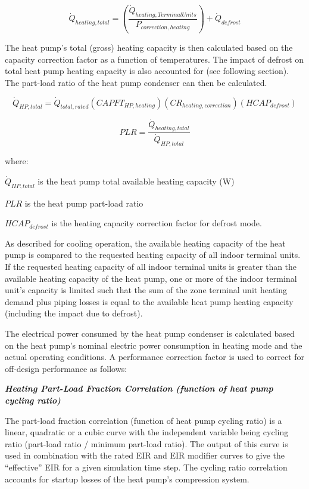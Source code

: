 \begin{equation}
  \dot{Q}_{heating,total} = \left( \frac{\dot{Q}_{heating,TerminalUnits}}{P_{correction,heating}} \right) + \dot{Q}_{defrost}
\end{equation}

The heat pump's total (gross) heating capacity is then calculated based on the capacity correction factor as a function of temperatures. The impact of defrost on total heat pump heating capacity is also accounted for (see following section). The part-load ratio of the heat pump condenser can then be calculated.

\begin{equation}
  \dot{Q}_{HP,total} = \dot{Q}_{total,rated} \left( CAPFT_{HP,heating} \right) \left( CR_{heating,correction} \right) \left( HCAP_{defrost} \right)
\end{equation}

\begin{equation}
  PLR = \frac{\dot{Q}_{heating,total}}{\dot{Q}_{HP,total}}
\end{equation}

where:

\(\dot{Q}_{HP,total}\) is the heat pump total available heating capacity (W)

\(PLR\) is the heat pump part-load ratio

\(HCAP_{defrost}\) is the heating capacity correction factor for defrost mode.

As described for cooling operation, the available heating capacity of the heat pump is compared to the requested heating capacity of all indoor terminal units. If the requested heating capacity of all indoor terminal units is greater than the available heating capacity of the heat pump, one or more of the indoor terminal unit's capacity is limited such that the sum of the zone terminal unit heating demand plus piping losses is equal to the available heat pump heating capacity (including the impact due to defrost).

The electrical power consumed by the heat pump condenser is calculated based on the heat pump's nominal electric power consumption in heating mode and the actual operating conditions. A performance correction factor is used to correct for off-design performance as follows:

\emph{\textbf{Heating Part-Load Fraction Correlation (function of heat pump cycling ratio)}}

The part-load fraction correlation (function of heat pump cycling ratio) is a linear, quadratic or a cubic curve with the independent variable being cycling ratio (part-load ratio / minimum part-load ratio). The output of this curve is used in combination with the rated EIR and EIR modifier curves to give the ``effective'' EIR for a given simulation time step. The cycling ratio correlation accounts for startup losses of the heat pump's compression system.

